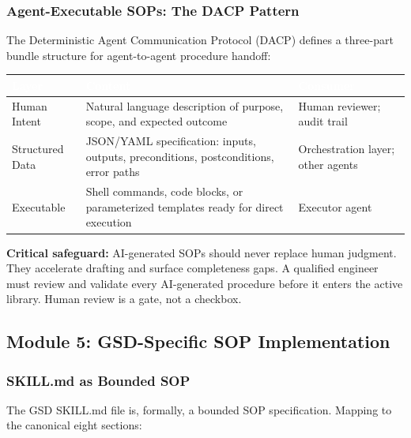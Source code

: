 \documentclass[11pt,letterpaper]{article}
\newcommand{\tableheader}[1]{\textbf{\sffamily\textcolor{white}{#1}}}
\begin{document}
\subsubsection{Agent-Executable SOPs: The DACP Pattern}

The Deterministic Agent Communication Protocol (DACP) defines a three-part bundle structure for agent-to-agent procedure handoff:

\begin{center}
\begin{tabularx}{\textwidth}{L{3cm}XL{3cm}}
\toprule
{}
\tableheader{Layer} & \tableheader{Content} & \tableheader{Consumer} \\
\midrule
Human Intent & Natural language description of purpose, scope, and expected outcome & Human reviewer; audit trail \\
Structured Data & JSON/YAML specification: inputs, outputs, preconditions, postconditions, error paths & Orchestration layer; other agents \\
Executable & Shell commands, code blocks, or parameterized templates ready for direct execution & Executor agent \\
\bottomrule
\end{tabularx}
\end{center}

\textbf{Critical safeguard:} AI-generated SOPs should never replace human judgment. They accelerate drafting and surface completeness gaps. A qualified engineer must review and validate every AI-generated procedure before it enters the active library. Human review is a gate, not a checkbox.

\subsection{Module 5: GSD-Specific SOP Implementation}

\subsubsection{SKILL.md as Bounded SOP}

The GSD SKILL.md file is, formally, a bounded SOP specification. Mapping to the canonical eight sections:
\end{document}
